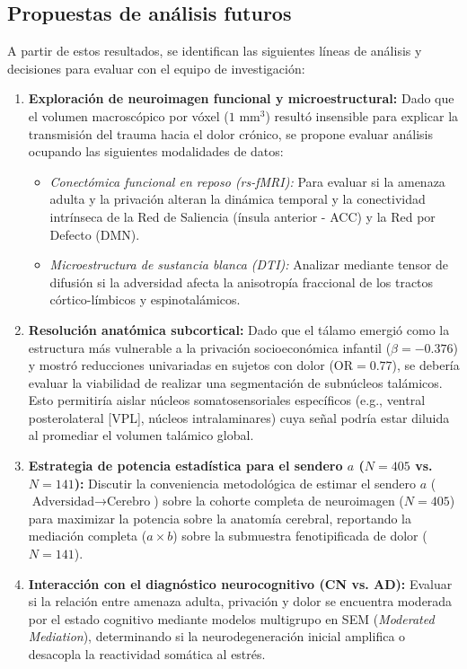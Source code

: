 \documentclass[11pt,a4paper]{article}
\begin{document}
\subsection{Propuestas de análisis futuros}
A partir de estos resultados, se identifican las siguientes líneas de análisis y decisiones para evaluar con el equipo de investigación: 
\begin{enumerate}
  \item \textbf{Exploración de neuroimagen funcional y microestructural:} Dado que el volumen macroscópico por vóxel ($1 \text{ mm}^3$) resultó insensible para explicar la transmisión del trauma hacia el dolor crónico, se propone evaluar análisis ocupando las 
  siguientes modalidades de datos: 
  \begin{itemize}
    \item \textit{Conectómica funcional en reposo (rs-fMRI):} Para evaluar si la amenaza adulta y la privación alteran la dinámica temporal y la conectividad intrínseca de la Red de Saliencia (ínsula anterior - ACC) y la Red por Defecto (DMN).
    \item \textit{Microestructura de sustancia blanca (DTI):} Analizar mediante tensor de difusión si la adversidad afecta la anisotropía fraccional de los tractos córtico-límbicos y espinotalámicos.
  \end{itemize}

  \item \textbf{Resolución anatómica subcortical:} Dado que el tálamo emergió como la estructura más vulnerable a la privación socioeconómica infantil ($\beta = -0.376$) y mostró reducciones univariadas en sujetos con dolor ($\text{OR} = 0.77$), se debería evaluar la viabilidad 
  de realizar una segmentación de subnúcleos talámicos. Esto permitiría aislar núcleos somatosensoriales específicos (e.g., ventral posterolateral [VPL], núcleos intralaminares) cuya señal podría estar diluida al promediar el volumen talámico global.

  \item \textbf{Estrategia de potencia estadística para el sendero $a$ ($N = 405$ vs. $N = 141$):} Discutir la conveniencia metodológica de estimar el sendero $a$ ($\text{Adversidad} \to \text{Cerebro}$) sobre la cohorte completa de neuroimagen ($N = 405$) para 
  maximizar la potencia sobre la anatomía cerebral, reportando la mediación completa ($a \times b$) sobre la submuestra fenotipificada de dolor ($N = 141$).

    \item \textbf{Interacción con el diagnóstico neurocognitivo (CN vs. AD):}
  Evaluar si la relación entre amenaza adulta, privación y dolor se encuentra moderada por el estado cognitivo mediante modelos multigrupo en SEM (\textit{Moderated Mediation}), determinando si la neurodegeneración inicial amplifica o desacopla la reactividad somática al estrés.
\end{enumerate}
\end{document}
